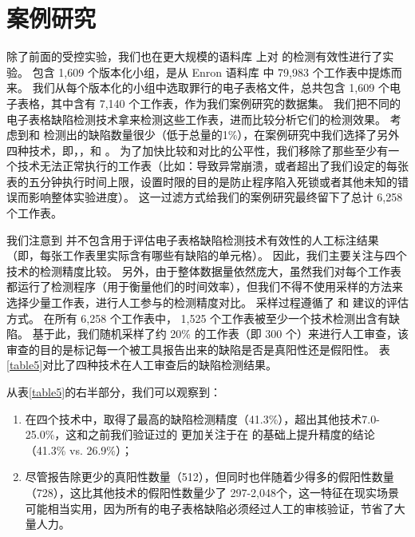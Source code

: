 \section{案例研究}




除了前面的受控实验，我们也在更大规模的语料库 \ven \cite{xu2017spreadcluster} 上对 \wa 的检测有效性进行了实验。
\ven 包含 1,609 个版本化小组，是从 Enron 语料库 \cite{hermans2015enron} 中 79,983 个工作表中提炼而来。
我们从每个版本化的小组中选取罪行的电子表格文件，总共包含 1,609 个电子表格，其中含有 7,140 个工作表，作为我们案例研究的数据集。
我们把不同的电子表格缺陷检测技术拿来检测这些工作表，进而比较分析它们的检测效果。
考虑到\uc 和 \di 检测出的缺陷数量很少（低于总量的1\%），在案例研究中我们选择了另外四种技术，即\am ，\ca  ，\cu 和 \wa 。
为了加快比较和对比的公平性，我们移除了那些至少有一个技术无法正常执行的工作表（比如：导致异常崩溃，或者超出了我们设定的每张表的五分钟执行时间上限，设置时限的目的是防止程序陷入死锁或者其他未知的错误而影响整体实验进度）。
这一过滤方式给我们的案例研究最终留下了总计 6,258 个工作表。

我们注意到 \ven 并不包含用于评估电子表格缺陷检测技术有效性的人工标注结果（即，每张工作表里实际含有哪些有缺陷的单元格）。
因此，我们主要关注与四个技术的检测精度比较。
另外，由于整体数据量依然庞大，虽然我们对每个工作表都运行了检测程序（用于衡量他们的时间效率），但我们不得不使用采样的方法来选择少量工作表，进行人工参与的检测精度对比。
采样过程遵循了 \am 和 \cu 建议的评估方式。
在所有 6,258 个工作表中， 1,525 个工作表被至少一个技术检测出含有缺陷。
基于此，我们随机采样了约 20\% 的工作表（即 300 个）来进行人工审查，该审查的目的是标记每一个被工具报告出来的缺陷是否是真阳性还是假阳性。
表\ref{table5}对比了四种技术在人工审查后的缺陷检测结果。

从表\ref{table5}的右半部分，我们可以观察到：
\begin{enumerate}
    \item 在四个技术中，\wa 取得了最高的缺陷检测精度（41.3\%），超出其他技术7.0-25.0\%，这和之前我们验证过的 \wa 更加关注于在 \cu 的基础上提升精度的结论（41.3\% vs. 26.9\%）；
    \item 尽管\wa 报告除更少的真阳性数量（512），但同时也伴随着少得多的假阳性数量（728），这比其他技术的假阳性数量少了 297-2,048个，这一特征在现实场景可能相当实用，因为所有的电子表格缺陷必须经过人工的审核验证，节省了大量人力。
\end{enumerate}

